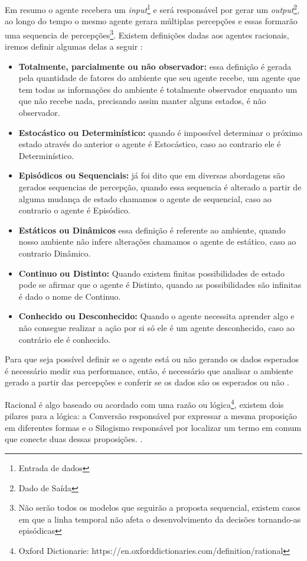 Em resumo o agente recebera um \textit{input}\footnote{Entrada de dados} e será responsável por gerar um \textit{output}\footnote{Dado de Saída}, ao longo do tempo o mesmo agente gerara múltiplas percepções e essas formarão uma sequencia de percepções\footnote{Não serão todos os modelos que seguirão a proposta sequencial, existem casos em que a linha temporal não afeta o desenvolvimento da decisões tornando-as episódicas}. \cite[34-35]{russell2003artificial} Existem definições dadas aos agentes racionais, iremos definir algumas delas a seguir \cite[42-45]{russell2003artificial}:

\begin{itemize}
 \item \textbf{Totalmente, parcialmente ou não observador:} essa definição é gerada pela quantidade de fatores do ambiente que seu agente recebe, um agente que tem todas as informações do ambiente é totalmente observador enquanto um que não recebe nada, precisando assim manter alguns estados, é não observador.
 \item \textbf{Estocástico ou Determinístico:} quando é impossível determinar o próximo estado através do anterior o agente é Estocástico, caso ao contrario ele é Determinístico.
 \item \textbf{Episódicos ou Sequenciais:} já foi dito que em diversas abordagens são gerados sequencias de percepção, quando essa sequencia é alterado a partir de alguma mudança de estado chamamos o agente de sequencial, caso ao contrario o agente é Episódico.
 \item \textbf{Estáticos ou Dinâmicos} essa definição é referente ao ambiente, quando nosso ambiente não infere alterações chamamos o agente de estático, caso ao contrario Dinâmico.
 \item \textbf{Continuo ou Distinto:} Quando existem finitas possibilidades de estado pode se afirmar que o agente é Distinto, quando as possibilidades são infinitas é dado o nome de Continuo.
 \item \textbf{Conhecido ou Desconhecido:} Quando o agente necessita aprender algo e não consegue realizar a ação por si só ele é um agente desconhecido, caso ao contrário ele é conhecido.
\end{itemize}

Para que seja possível definir se o agente está ou não gerando os dados esperados é necessário medir sua performance, então, é necessário que analisar o ambiente gerado a partir das percepções e conferir se os dados são os esperados ou não \cite[294-295]{frege1956thought}.

Racional é algo baseado ou acordado com uma razão ou lógica\footnote{Oxford Dictionarie:  https://en.oxforddictionaries.com/definition/rational}, existem dois pilares para a lógica: a Conversão responsável por expressar a mesma proposição em diferentes formas e o Silogismo responsável por localizar um termo em comum que conecte duas dessas proposições. \cite[175]{boole1854investigation}.